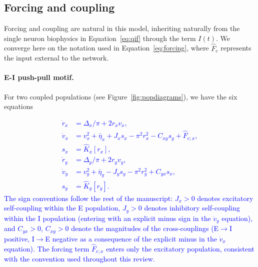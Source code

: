 \documentclass[12pt]{article}
\numberwithin{equation}{section}
\newcommand{\rev}[1]{\textcolor{blue}{#1}}
\begin{document}
\subsection{Forcing and coupling}
Forcing and coupling are natural in this model, inheriting naturally from the single neuron biophysics in Equation~\ref{eq:qif} through the term $I(t)$. We converge here on the notation used in Equation~\ref{eq:forcing}, where $\hat F_e$ represents the input external to the network.



\paragraph{E-I push-pull motif.}  For two coupled populations (see Figure~\ref{fig:popdiagrams}), we have the six equations

\rev{\begin{equation}
\begin{aligned}
\dot r_x &= \Delta_x/\pi + 2 r_x v_x, \\
\dot v_x &= v_x^2 + \bar\eta_x + J_x s_x - \pi^2 r_x^2 - C_{xy} s_y + \hat F_{e;x}, \\
s_x &= \hat K_x[r_x], \\
\dot r_y &= \Delta_y/\pi + 2 r_y v_y, \\
\dot v_y &= v_y^2 + \bar\eta_y - J_y s_y - \pi^2 r_y^2 + C_{yx} s_x, \\
s_y &= \hat K_y[r_y].
\end{aligned}
\label{eq:nmm2-EI-pushpull}
\end{equation}
The sign conventions follow the rest of the manuscript: $J_x>0$ denotes excitatory self-coupling within the E population, $J_y>0$ denotes inhibitory self-coupling within the I population (entering with an explicit minus sign in the $\dot v_y$ equation), and $C_{yx}>0$, $C_{xy}>0$ denote the magnitudes of the cross-couplings (E$\to$I positive, I$\to$E negative as a consequence of the explicit minus in the $\dot v_x$ equation). The forcing term $\hat F_{e;x}$ enters only the excitatory population, consistent with the convention used throughout this review.}
\end{document}
